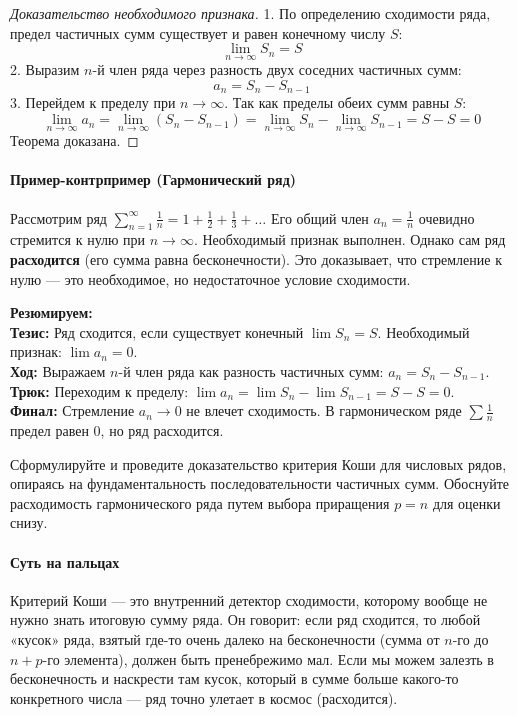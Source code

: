 \begin{proof}[Доказательство необходимого признака]
1. По определению сходимости ряда, предел частичных сумм существует и равен конечному числу $S$:
$$\lim_{n \to \infty} S_n = S$$
2. Выразим $n$-й член ряда через разность двух соседних частичных сумм:
$$a_n = S_n - S_{n-1}$$
3. Перейдем к пределу при $n \to \infty$. Так как пределы обеих сумм равны $S$:
$$\lim_{n \to \infty} a_n = \lim_{n \to \infty} (S_n - S_{n-1}) = \lim_{n \to \infty} S_n - \lim_{n \to \infty} S_{n-1} = S - S = 0$$
Теорема доказана.
\end{proof}

\paragraph{Пример-контрпример (Гармонический ряд)}
Рассмотрим ряд $\sum_{n=1}^\infty \frac{1}{n} = 1 + \frac{1}{2} + \frac{1}{3} + \dots$ 
Его общий член $a_n = \frac{1}{n}$ очевидно стремится к нулю при $n \to \infty$. Необходимый признак выполнен. Однако сам ряд \textbf{расходится} (его сумма равна бесконечности). Это доказывает, что стремление к нулю — это необходимое, но недостаточное условие сходимости.
\begin{tcolorbox}[colback=gray!5, colframe=black, boxrule=0.5pt, arc=0pt]
\textbf{Резюмируем:} \\
\textbf{Тезис:} Ряд сходится, если существует конечный $\lim S_n = S$. Необходимый признак: $\lim a_n = 0$. \\
\textbf{Ход:} Выражаем $n$-й член ряда как разность частичных сумм: $a_n = S_n - S_{n-1}$. \\
\textbf{Трюк:} Переходим к пределу: $\lim a_n = \lim S_n - \lim S_{n-1} = S - S = 0$. \\
\textbf{Финал:} Стремление $a_n \to 0$ не влечет сходимость. В гармоническом ряде $\sum \frac{1}{n}$ предел равен 0, но ряд расходится.
\end{tcolorbox}


{Сформулируйте и проведите доказательство критерия Коши для числовых рядов, опираясь на фундаментальность последовательности частичных сумм. Обоснуйте расходимость гармонического ряда путем выбора приращения $p=n$ для оценки снизу.}

\paragraph{Суть на пальцах}
Критерий Коши — это внутренний детектор сходимости, которому вообще не нужно знать итоговую сумму ряда. Он говорит: если ряд сходится, то любой «кусок» ряда, взятый где-то очень далеко на бесконечности (сумма от $n$-го до $n+p$-го элемента), должен быть пренебрежимо мал. Если мы можем залезть в бесконечность и наскрести там кусок, который в сумме больше какого-то конкретного числа — ряд точно улетает в космос (расходится).

